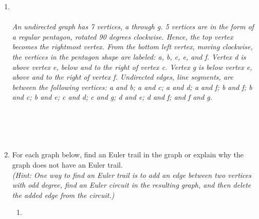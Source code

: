 \documentclass{amsart}
\theoremstyle{definition}
\theoremstyle{Exercise}
\theoremstyle{remark}
\theoremstyle{rule}
\numberwithin{equation}{section}
\begin{document}
\begin{enumerate}[label=(\alph*)]
\newpage
\item
{}\\\\
{\color{blue}{\bf Figure 10:} \emph{An undirected graph has 7 vertices, a through g. 5 vertices are in the form of a regular pentagon, rotated 90 degrees clockwise. Hence, the top vertex becomes the rightmost vertex. From the bottom left vertex, moving clockwise, the vertices in the pentagon shape are labeled: a, b, c, e, and f. Vertex d is above vertex e, below and to the right of vertex c. Vertex g is below vertex e, above and to the right of vertex f. Undirected edges, line segments, are between the following vertices: a and b; a and c; a and d; a and f; b and f; b and c; b and e; c and d; c and g; d and e; d and f; and f and g.
\\
}
}
\\
\\
\\\\

\newpage

\item
For each graph below, find an Euler trail in the graph or explain why the graph does not have an Euler trail.\\

{\it (Hint: One way to find an Euler trail is to add an edge between two vertices with odd degree, find an Euler circuit in the resulting graph, and then delete the added edge from the circuit.)}\\
\begin{enumerate}[label=(\roman*)]
\item
{}
\end{enumerate}
\end{enumerate}
\end{document}
